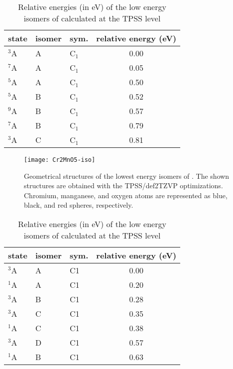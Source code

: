 \begin{table}[]
	\centering
	\caption{Relative energies (in eV) of the low energy isomers of  calculated at the TPSS level}
	\begin{tabular}{@{}lllc@{}}
	\toprule
	state & isomer & sym. & relative energy (eV) \\ \midrule
	$^3$A    & A      & C$_1$   & 0.00                 \\
	$^7$A    & A      & C$_1$   & 0.05                 \\
	$^5$A    & A      & C$_1$   & 0.50                 \\
	$^5$A    & B      & C$_1$   & 0.52                 \\
	$^9$A    & B      & C$_1$   & 0.57                 \\
	$^7$A    & B      & C$_1$   & 0.79                 \\
	$^3$A    & C      & C$_1$   & 0.81                 \\ \bottomrule
	\end{tabular}
\end{table}

\begin{figure}
	\centering
	\texttt{[image: Cr2MnO5-iso]}
	\caption{Geometrical structures of the lowest energy isomers of . The shown structures are obtained with the TPSS/def2TZVP optimizations. Chromium, manganese, and oxygen atoms are represented as blue, black, and red spheres, respectively.}
	\label{figs:Cr2MnO5}
\end{figure}






\begin{table}[]
	\centering
	\caption{Relative energies (in eV) of the low energy isomers of  calculated at the TPSS level}
	\begin{tabular}{@{}lllc@{}}
	\toprule
	state & isomer & sym. & relative energy (eV) \\ \midrule
	$^3$A    & A      & C1   & 0.00                 \\
	$^1$A    & A      & C1   & 0.20                 \\
	$^3$A    & B      & C1   & 0.28                 \\
	$^3$A    & C      & C1   & 0.35                 \\
	$^1$A    & C      & C1   & 0.38                 \\
	$^3$A    & D      & C1   & 0.57                 \\
	$^1$A    & B      & C1   & 0.63                 \\ \bottomrule
	\end{tabular}
\end{table}



